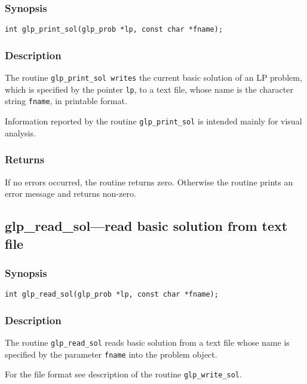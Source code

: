 \subsubsection*{Synopsis}

\begin{verbatim}
int glp_print_sol(glp_prob *lp, const char *fname);
\end{verbatim}

\subsubsection*{Description}

The routine \verb|glp_print_sol writes| the current basic solution of
an LP problem, which is specified by the pointer \verb|lp|, to a text
file, whose name is the character string \verb|fname|, in printable
format.

Information reported by the routine \verb|glp_print_sol| is intended
mainly for visual analysis.

\subsubsection*{Returns}

If no errors occurred, the routine returns zero. Otherwise the routine
prints an error message and returns non-zero.

\subsection{glp\_read\_sol---read basic solution from text file}

\subsubsection*{Synopsis}

\begin{verbatim}
int glp_read_sol(glp_prob *lp, const char *fname);
\end{verbatim}

\subsubsection*{Description}

The routine \verb|glp_read_sol| reads basic solution from a text file
whose name is specified by the parameter \verb|fname| into the problem
object.

For the file format see description of the routine \verb|glp_write_sol|.

